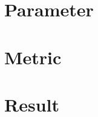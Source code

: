 \section{Parameter} \label{sec:parameter}


\section{Metric} \label{sec:metric}


\section{Result} \label{sec:result}





    

